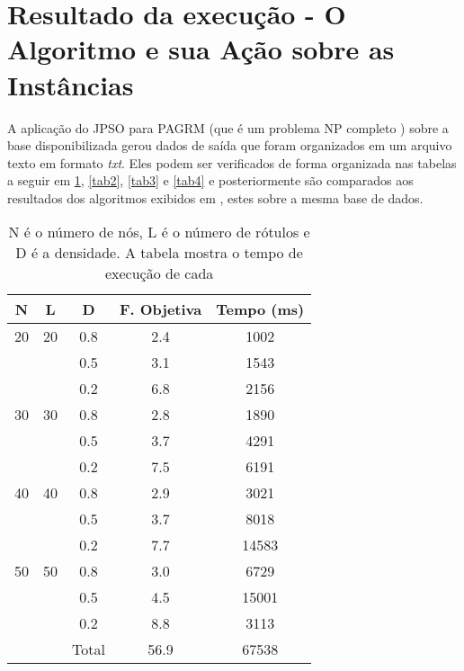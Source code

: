 \documentclass{sig-alternate-05-2015}
\begin{document}
\section*{Resultado da execução - O Algoritmo e sua Ação sobre as Instâncias} \label{sec4}
A aplicação do JPSO para PAGRM (que é um problema NP completo \cite{Ladner:1975:SPT:321864.321877}) sobre a base disponibilizada gerou dados de saída que foram 
organizados em um arquivo texto em formato \textit{txt}. Eles podem ser verificados de forma organizada nas tabelas a seguir em \ref{tab1}, \ref{tab2}, \ref{tab3} 
e \ref{tab4} e posteriormente são comparados aos resultados dos algoritmos exibidos em \cite{consoli2009greedy}, estes sobre a mesma base de dados. 
\begin{table}[!h]
        

\begin{tabular}{ccccc}

        \hline \rule[-2ex]{0pt}{5.5ex} N & L & D & F. Objetiva & Tempo (ms) \\ 
        \hline \rule[-2ex]{0pt}{5.5ex} 20 & 20 & 0.8 & 2.4 & 1002 \\ 
         \rule[-2ex]{0pt}{5.5ex}  &  & 0.5 & 3.1 & 1543 \\ 
         \rule[-2ex]{0pt}{5.5ex}  &  & 0.2 & 6.8 & 2156 \\ 
         \rule[-2ex]{0pt}{5.5ex} 30 & 30 & 0.8 & 2.8 & 1890 \\ 
         \rule[-2ex]{0pt}{5.5ex}  &  & 0.5 & 3.7 & 4291 \\ 
         \rule[-2ex]{0pt}{5.5ex}  &  & 0.2 & 7.5 & 6191 \\ 
         \rule[-2ex]{0pt}{5.5ex} 40 & 40 & 0.8 & 2.9 & 3021 \\ 
         \rule[-2ex]{0pt}{5.5ex}  &  & 0.5 & 3.7 & 8018 \\ 
         \rule[-2ex]{0pt}{5.5ex}  &  & 0.2 & 7.7 & 14583 \\
         \rule[-2ex]{0pt}{5.5ex} 50 & 50 & 0.8 & 3.0 & 6729 \\
         \rule[-2ex]{0pt}{5.5ex}  &  & 0.5 & 4.5 & 15001 \\
         \rule[-2ex]{0pt}{5.5ex}  &  & 0.2 & 8.8 & 3113 \\
        \hline \rule[-2ex]{0pt}{5.5ex}  &  & Total & 56.9 & 67538 \\
        \hline
\end{tabular}

\caption{N é o número de nós, L é o número de rótulos e D é a densidade.  A tabela mostra o tempo de execução de cada}
\label{tab1}
\end{table}
\end{document}
